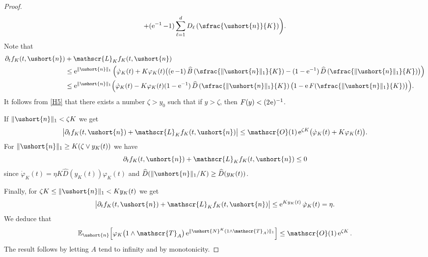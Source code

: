\documentclass[10pt]{amsart}
\newcommand{\scaleto}[2]{#1}
\let\mathcal\mathscr
\numberwithin{equation}{section}
\theoremstyle{plain}
\theoremstyle{definition}
\newcommand{\E}{{\mathbb{E}}}
\newcommand{\Oun}{\mathcal{O}(1)}
\newcommand{\sK}{K}
\newcommand{\gen}{\mathscr{L}_{\sK}}
\newcommand{\vecn}{\ushort{n}}
\newcommand{\sleproc}{\ushort{N}^{K}}
\newcommand{\e}{\operatorname{e}}
\newcommand{\norm}[1]{\|#1\|_{1}}\let\snorm\norm
\begin{document}
\begin{proof}
\begin{multline*}
+(\e^{-1}-1)\sum_{\ell=1}^{d}D_{\ell}\left(\sfrac{\vecn}{K}\right)\biggr).
\end{multline*}
Note that
\begin{align*}
\partial_{t}f_{\sK}(t,\vecn)&+\gen f_{\sK}(t,\vecn)\\
& \leq \e^{\|\vecn\|_{1}}\left(\dot\varphi_{\sK}(t)
+ K\varphi_{\sK}(t) \bigl((\e-1)\,\widehat{B}\left(\sfrac{\norm{\vecn}}{K}\right)-(1-\e^{-1})\,\widehat{D}\left(\sfrac{\norm{\vecn}}{K}\right)\bigr)\right)
\\
&\leq
\e^{\|\vecn\|_{1}}\Bigl(\dot\varphi_{\sK}(t)- K\varphi_{\sK}(t)(1-\e^{-1})\,\widehat{D}\left(\sfrac{\norm{\vecn}}{K}\right)
\bigl(1 - \e F(\sfrac{\norm{\vecn}}{K})\bigr)\Bigr).
\end{align*}
It follows from \eqref{H5} that there exists a number $\zeta>y_{0}$ such that if $y>\zeta$, then $F(y)<(2 \hspace{-1pt}\e)^{-1}$.

If $\norm{\vecn}<\zeta K$ we get
\[
\big|\partial_{t}f_{\sK}(t,\vecn)+\gen f_{\sK}(t,\vecn)\big|\le
\Oun \e^{\zeta K}\bigl(\dot\varphi_{\sK}(t)+K\varphi_{\sK}(t)\bigr).
\]
For $\norm{\vecn}\ge K(\zeta\vee y_{\sK}(t))$ we have
\[
\partial_{t}f_{\sK}(t,\vecn)+\gen f_{\sK}(t,\vecn)\le 0
\]
since $\dot\varphi_{\sK}(t) = \eta K \widehat{D}(y_{\sK}(t))\varphi_{\sK}(t)$ and $\widehat{D}(\norm{\vecn}/K)\geq \widehat{D}(y_{\sK}(t))$.

Finally, for $\zeta K\le \norm{\vecn}<K y_{\sK}(t)$ we get
\[
\big|\partial_{t}f_{\sK}(t,\vecn)+\gen f_{\sK}(t,\vecn)\big|\le \e^{K y_{\sK}(t)}\dot\varphi_{\sK}(t) = \eta.
\]
We deduce that
\[
\E_{\vecn}\Bigl[\varphi_{\sK}\bigl(1\wedge \mathcal{T}_A\bigr)\e^{\|\sleproc(1\wedge \mathcal{T}_A)\|_{\scaleto{1}
{3.5pt}}}\Bigr]
\le \Oun \e^{\zeta K}.
\]
The result follows by letting $A$ tend to infinity and by monotonicity.
\end{proof}
\end{document}
